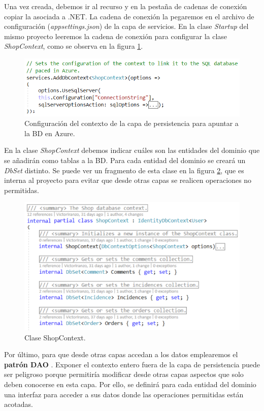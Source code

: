 \documentclass[11pt,spanish,listoffigures]{tfgetsinf}
\begin{document}
Una vez creada, debemos ir al recurso y en la pestaña de cadenas de conexión copiar la asociada a .NET. La cadena de conexión la pegaremos en el archivo de configuración (\textit{appsettings.json}) de la capa de servicios. En la clase \textit{Startup} del mismo proyecto leeremos la cadena de conexión para configurar la clase \textit{ShopContext}, como se observa en la figura \ref{fig:AddDbContext}.

\begin{figure}[h]
\centering
\includegraphics[scale=0.7]{AddDbContext}
\caption{Configuración del contexto de la capa de persistencia para apuntar a la BD en Azure.}
\label{fig:AddDbContext}
\end{figure}

En la clase \textit{ShopContext} debemos indicar cuáles son las entidades del dominio que se añadirán como tablas a la BD. Para cada entidad del dominio se creará un \textit{DbSet} distinto. Se puede ver un fragmento de esta clase en la figura \ref{fig:ShopContext}, que es interna al proyecto para evitar que desde otras capas se realicen operaciones no permitidas.

\begin{figure}[h]
\centering
\includegraphics[scale=0.8]{ShopContext}
\caption{Clase ShopContext.}
\label{fig:ShopContext}
\end{figure}

Por último, para que desde otras capas accedan a los datos emplearemos el \textbf{patrón DAO} \cite{Shubham2018}. Exponer el contexto entero fuera de la capa de persistencia puede ser peligroso porque permitiría modificar desde otras capas aspectos que solo deben conocerse en esta capa. Por ello, se definirá para cada entidad del dominio una interfaz para acceder a sus datos donde las operaciones permitidas están acotadas.
\end{document}
